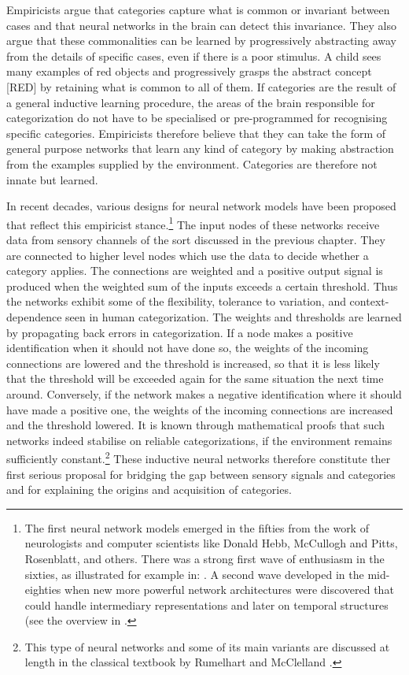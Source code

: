 Empiricists argue that categories 
capture what is common or invariant between cases and that
neural networks in the brain
can detect this invariance. They also argue
that these commonalities can be learned
by progressively abstracting away from the details of specific
cases, even if there is a poor stimulus. 
A child sees many examples of red objects and
progressively grasps the abstract concept [RED] 
by retaining what is common to all of them. 
If categories are the result of a general 
inductive learning procedure, the areas of the brain
responsible for categorization do not have to be
specialised or pre-programmed for recognising 
specific categories. Empiricists therefore believe that 
they can take the 
form of general purpose networks that learn any kind 
of category by making abstraction from the examples 
supplied by the environment. Categories are therefore
not innate but learned. 

In recent decades, various designs for neural network models
have been proposed that reflect this empiricist stance.\footnote{
The first neural network models emerged in the 
fifties from the work of neurologists and computer 
scientists like Donald Hebb, McCullogh and Pitts, 
Rosenblatt, and others. There was a strong first wave of 
enthusiasm in the sixties, as illustrated for 
example in: \cite{Minsky:1968}. 
A second wave developed in the mid-eighties when 
new more powerful network architectures were discovered
that could handle intermediary representations and 
later on temporal structures (see the overview 
in \cite{Churchland:1992}. }
The input nodes of these networks receive data
from sensory channels of the sort discussed in the 
previous chapter. They are connected to higher
level nodes which use the data to decide whether
a category applies. The connections are weighted and 
a positive output signal is produced when 
the weighted sum of the inputs 
exceeds a certain threshold. Thus the networks
exhibit some of the flexibility, tolerance
to variation, and context-dependence seen in human
categorization. The weights and thresholds are 
learned by propagating back errors in categorization. 
If a node makes a positive identification when 
it should not have done so, the weights of the 
incoming connections are lowered and the threshold is
increased, so that it is less likely that the threshold
will be exceeded again for the same situation the next time around. 
Conversely, if the network makes a negative identification where
it should have made a positive one, the weights 
of the incoming connections are increased 
and the threshold lowered. It is known 
through mathematical proofs that such networks indeed
stabilise on reliable categorizations, if the 
environment remains sufficiently constant.\footnote{
This type of neural networks and some of its
main variants are discussed at length in the classical 
textbook by Rumelhart and McClelland \cite{Rumelhart:1986}.}
These inductive neural networks therefore
constitute ther first serious proposal for bridging the gap between
sensory signals and categories and for explaining the 
origins and acquisition of categories. 

